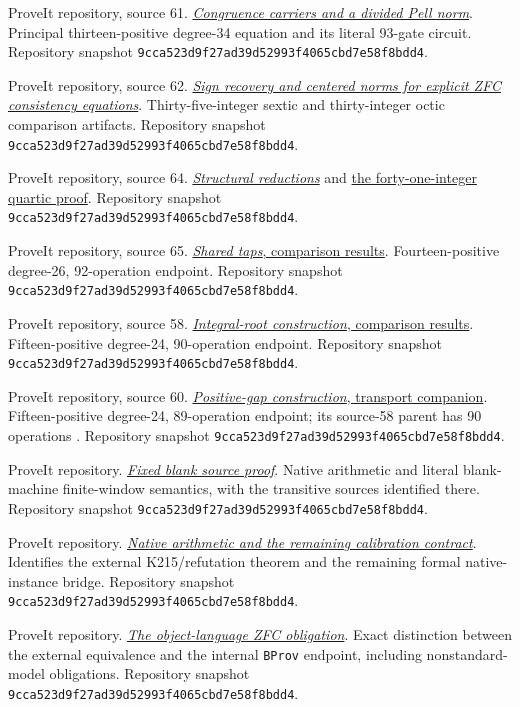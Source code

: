 \documentclass[11pt,a4paper]{article}
\theoremstyle{definition}
\newcommand{\snapshot}{\texttt{9cca523d9f27ad39d52993f4065cbd7e58f8bdd4}}
\newcommand{\repofile}[2]{\href{https://github.com/VladimirReshetnikov/ProveIt/blob/9cca523d9f27ad39d52993f4065cbd7e58f8bdd4/Computability/DiophantineConsistency/#1}{#2}}
\newcommand{\formfile}[2]{\repofile{con-zfc-diophantine-forms/#1}{#2}}
\begin{document}
\begin{thebibliography}{99}
ProveIt repository, source 61.
\formfile{61-congruence-carriers/README.md}
{\emph{Congruence carriers and a divided Pell norm}}.
Principal thirteen-positive degree-34 equation and its literal
93-gate circuit.  Repository snapshot \snapshot.

ProveIt repository, source 62.
\formfile{62-sign-and-norm/README.md}
{\emph{Sign recovery and centered norms for explicit ZFC consistency
equations}}.
Thirty-five-integer sextic and thirty-integer octic comparison
artifacts.  Repository snapshot \snapshot.

ProveIt repository, source 64.
\formfile{64-structural-reductions/README.md}
{\emph{Structural reductions}} and
\formfile{64-structural-reductions/integer41/PROOF41.md}
{the forty-one-integer quartic proof}.
Repository snapshot \snapshot.

ProveIt repository, source 65.
\formfile{65-shared-taps/README.md}
{\emph{Shared taps}, comparison results}.
Fourteen-positive degree-26, 92-operation endpoint.
Repository snapshot \snapshot.

ProveIt repository, source 58.
\formfile{58-integral-root/README.md}
{\emph{Integral-root construction}, comparison results}.
Fifteen-positive degree-24, 90-operation endpoint.
Repository snapshot \snapshot.

ProveIt repository, source 60.
\formfile{60-positive-gap/README.md}
{\emph{Positive-gap construction}, transport companion}.
Fifteen-positive degree-24, 89-operation endpoint; its source-58
parent has 90 operations \cite{source58}.
Repository snapshot \snapshot.

ProveIt repository.
\formfile{31-sun10/sources/FIXED_BLANK_67_PROOF.md}
{\emph{Fixed blank source proof}}.
Native arithmetic and literal blank-machine finite-window semantics,
with the transitive sources identified there.
Repository snapshot \snapshot.

ProveIt repository.
\repofile{NATIVE_CALIBRATION52.md}
{\emph{Native arithmetic and the remaining calibration contract}}.
Identifies the external K215/refutation theorem and the remaining
formal native-instance bridge.
Repository snapshot \snapshot.

ProveIt repository.
\repofile{OBJECT_ZFC.md}{\emph{The object-language ZFC obligation}}.
Exact distinction between the external equivalence and the internal
\texttt{BProv} endpoint, including nonstandard-model obligations.
Repository snapshot \snapshot.

\end{thebibliography}
\end{document}
